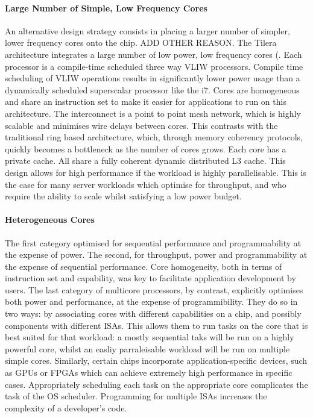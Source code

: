 \paragraph{Large Number of Simple, Low Frequency Cores} An alternative
design strategy consists in placing a larger number of simpler, lower frequency cores
onto the chip.  ADD OTHER REASON. The Tilera
architecture integrates a large number of low power, low frequency 
cores (. Each processor is a compile-time scheduled three way VLIW processors.
Compile time scheduling of VLIW operations results in significantly
lower power usage than a dynamically scheduled superscalar
processor like the i7. Cores are homogeneous and share 
an instruction set to make it easier for applications to run on
this architecture.  The interconnect is a point to point mesh network, which
is highly scalable and minimises wire delays between cores. This
contrasts with the traditional ring based architecture, which,
through memory coherency protocols, quickly becomes a bottleneck
as the number of cores grows. Each
core has a private cache. All share a fully coherent dynamic
distributed L3 cache.  This design allows for high performance
if the workload is highly parallelisable. This is the case for many 
server workloads which optimise for throughput, and who require
the ability to scale whilst satisfying a low power budget.  

\paragraph{Heterogeneous Cores} The first category optimised for 
sequential performance and programmability at the expense of power. The second, 
for throughput, power and programmability at the expense of sequential performance. 
Core homogeneity, both in terms of instruction set and capability,
was key to facilitate application development by users. The last category
of multicore processors, by contrast, explicitly optimises both
power and performance, at the expense of programmibility. They do so in two ways: 
by associating cores with different capabilities on a chip, and possibly components
with different ISAs. This allows them to run tasks on the core
that is best suited for that workload: a mostly sequential taks will be run 
on a highly powerful core, whilst an easliy parraleisable workload
will be run on multiple simple cores. Similarly, certain chips incorporate
application-specific devices, such as GPUs or FPGAs which can achieve extremely
high performance in specific cases. Appropriately scheduling each 
task on the appropriate core complicates the task of the OS scheduler.
Programming for multiple ISAs increases the complexity of a developer's code. 

